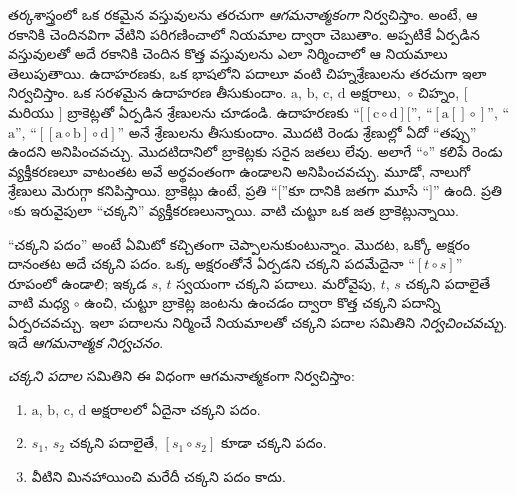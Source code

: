 \documentclass[../../../include/open-logic-section]{subfiles}
\begin{document}


తర్కశాస్త్రంలో ఒక రకమైన వస్తువులను తరచుగా
\emph{ఆగమనాత్మకంగా} నిర్వచిస్తాం. అంటే, ఆ రకానికి చెందినవిగా
వేటిని పరిగణించాలో నియమాల ద్వారా చెబుతాం. అప్పటికే ఏర్పడిన
వస్తువులతో అదే రకానికి చెందిన కొత్త వస్తువులను ఎలా
నిర్మించాలో ఆ నియమాలు తెలుపుతాయి. ఉదాహరణకు, ఒక భాషలోని
పదాలూ  వంటి చిహ్నశ్రేణులను
తరచుగా ఇలా నిర్వచిస్తాం. ఒక సరళమైన ఉదాహరణ తీసుకుందాం. $\mathrm{a}$, $\mathrm{b}$, $\mathrm{c}$, $\mathrm{d}$ అక్షరాలు,~$\circ$ చిహ్నం, $[$ మరియు $]$ బ్రాకెట్లతో ఏర్పడిన శ్రేణులను చూడండి. ఉదాహరణకు
``$[[\mathrm{c} \circ \mathrm{d}][$'', ``$[\mathrm{a}[]\circ]$'',
``$\mathrm{a}$'', ``$[[\mathrm{a} \circ \mathrm{b}]\circ
\mathrm{d}]$'' అనే శ్రేణులను తీసుకుందాం. మొదటి రెండు శ్రేణుల్లో ఏదో ``తప్పు'' ఉందని అనిపించవచ్చు.
మొదటిదానిలో బ్రాకెట్లకు సరైన జతలు లేవు. అలాగే ``$\circ$''
కలిపే రెండు వ్యక్తీకరణలూ వాటంతట అవే అర్థవంతంగా ఉండాలని
అనిపించవచ్చు. మూడో, నాలుగో శ్రేణులు మెరుగ్గా కనిపిస్తాయి.
బ్రాకెట్లు ఉంటే, ప్రతి ``$[$''కూ దానికి జతగా మూసే ``$]$'' ఉంది.
ప్రతి $\circ$కు ఇరువైపులా ``చక్కని'' వ్యక్తీకరణలున్నాయి.
వాటి చుట్టూ ఒక జత బ్రాకెట్లున్నాయి.

``చక్కని పదం'' అంటే ఏమిటో కచ్చితంగా చెప్పాలనుకుంటున్నాం. మొదట, ఒక్కో అక్షరం దానంతట అదే చక్కని పదం. ఒక్క అక్షరంతోనే ఏర్పడని చక్కని పదమేదైనా ``$[t \circ s]$'' రూపంలో ఉండాలి; ఇక్కడ $s$, $t$ స్వయంగా చక్కని పదాలు. మరోవైపు, $t$, $s$ చక్కని పదాలైతే వాటి మధ్య $\circ$ ఉంచి, చుట్టూ బ్రాకెట్ల జంటను ఉంచడం ద్వారా కొత్త చక్కని పదాన్ని ఏర్పరచవచ్చు. ఇలా పదాలను నిర్మించే నియమాలతో చక్కని పదాల సమితిని \emph{నిర్వచించవచ్చు}. ఇదే \emph{ఆగమనాత్మక నిర్వచనం}.

\begin{defn}[చక్కని పదాలు]
  \emph{చక్కని పదాల} సమితిని ఈ విధంగా ఆగమనాత్మకంగా నిర్వచిస్తాం:
  \begin{enumerate}
  \item $\mathrm{a}$, $\mathrm{b}$, $\mathrm{c}$,
    $\mathrm{d}$ అక్షరాలలో ఏదైనా చక్కని పదం.
  \item $s_1$, $s_2$ చక్కని పదాలైతే,
    $[s_1 \circ s_2]$ కూడా చక్కని పదం.
  \item వీటిని మినహాయించి మరేదీ చక్కని పదం కాదు.
  \end{enumerate}
\end{defn}
\end{document}
